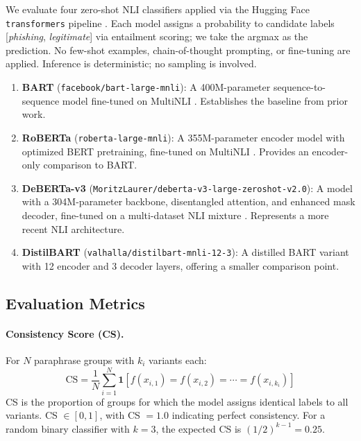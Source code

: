 \documentclass[11pt]{article}
\begin{document}
We evaluate four zero-shot NLI classifiers applied via the Hugging Face \texttt{transformers} pipeline \citep{wolf2020transformers}. Each model assigns a probability to candidate labels [\textit{phishing}, \textit{legitimate}] via entailment scoring; we take the argmax as the prediction. No few-shot examples, chain-of-thought prompting, or fine-tuning are applied. Inference is deterministic; no sampling is involved.

\begin{enumerate}[leftmargin=*, itemsep=3pt]
  \item \textbf{BART} (\texttt{facebook/bart-large-mnli}): A 400M-parameter sequence-to-sequence model fine-tuned on MultiNLI \citep{williams2018broad}. Establishes the baseline from prior work.
  \item \textbf{RoBERTa} (\texttt{roberta-large-mnli}): A 355M-parameter encoder model with optimized BERT pretraining, fine-tuned on MultiNLI \citep{liu2019roberta}. Provides an encoder-only comparison to BART.
  \item \textbf{DeBERTa-v3} (\texttt{MoritzLaurer/deberta-v3-large-zeroshot-v2.0}): A model with a 304M-parameter backbone, disentangled attention, and enhanced mask decoder, fine-tuned on a multi-dataset NLI mixture \citep{he2021deberta}. Represents a more recent NLI architecture.
  \item \textbf{DistilBART} (\texttt{valhalla/distilbart-mnli-12-3}): A distilled BART variant with 12 encoder and 3 decoder layers, offering a smaller comparison point.
\end{enumerate}

\subsection{Evaluation Metrics}

\paragraph{Consistency Score (CS).} For $N$ paraphrase groups with $k_i$ variants each:
\begin{equation}
  \text{CS} = \frac{1}{N} \sum_{i=1}^{N} \mathbf{1}\!\left[ f(x_{i,1}) = f(x_{i,2}) = \cdots = f(x_{i,k_i}) \right]
  \label{eq:cs}
\end{equation}
CS is the proportion of groups for which the model assigns identical labels to all variants. CS $\in [0, 1]$, with CS $= 1.0$ indicating perfect consistency. For a random binary classifier with $k=3$, the expected CS is $(1/2)^{k-1} = 0.25$.
\end{document}
